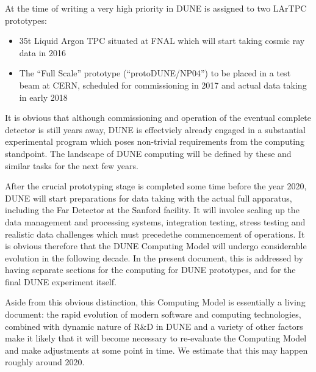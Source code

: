 At the time of writing a very high priority in DUNE is assigned to two LArTPC prototypes:
\begin{itemize}
\item 35t Liquid Argon TPC situated at FNAL which will start taking cosmic ray data in 2016
\item The ``Full Scale'' prototype (``protoDUNE/NP04'') to be placed in a test beam at CERN, scheduled for commissioning in 2017 and actual data taking in early 2018
\end{itemize}
\noindent
It is obvious that although commissioning and operation of the eventual complete detector is still years away, DUNE is effectviely
already engaged in a substantial experimental program which poses non-trivial requirements from the computing standpoint. The
landscape of DUNE computing will be defined by these and similar tasks for the next few years.

After the crucial prototyping stage is completed some time before the year 2020, DUNE will start preparations for data taking with the
actual full apparatus, including the Far Detector at the Sanford facility. It will involce scaling up the data management and processing systems,
integration testing,  stress testing and  realistic data challenges which must precedethe commencement of operations.
It is obvious therefore that the DUNE Computing Model will undergo considerable evolution in the following decade. In the present document,
this is addressed  by having separate sections for the computing for DUNE prototypes, and for the final DUNE experiment itself.

Aside from this obvious distinction, this Computing Model is essentially a living document: 
the rapid evolution of modern software and computing technologies, combined with dynamic nature of R\&D in DUNE
and a variety of other factors make it likely that it will become necessary to re-evaluate the Computing Model and make adjustments at
some point in time. We estimate that this may happen roughly around 2020.

